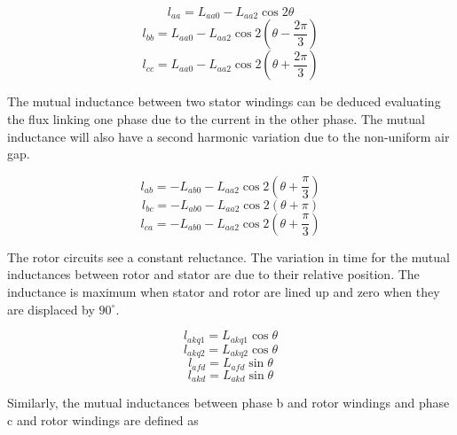 \begin{equation} \label{eq:SelfInductanceA}
	l_{aa} = L_{aa0} - L_{aa2} \cos 2 \theta
\end{equation}
\begin{equation} \label{eq:SelfInductanceB}
	l_{bb} = L_{aa0} - L_{aa2} \cos 2 (\theta - \frac{2 \pi}{3})
\end{equation}
\begin{equation} \label{eq:SelfInductanceC}
	l_{cc} = L_{aa0} - L_{aa2} \cos 2 (\theta + \frac{2 \pi}{3})
\end{equation}

The mutual inductance between two stator windings can be deduced evaluating the flux linking one phase due to the current in the other phase. The mutual inductance will also have a second harmonic variation due to the non-uniform air gap.

\begin{equation} \label{eq:MutualInductanceAB}
	l_{ab} = -L_{ab0} - L_{aa2} \cos 2(\theta + \frac{\pi}{3})
\end{equation}
\begin{equation} \label{eq:MutualInductanceBC}
	l_{bc} = -L_{ab0} - L_{aa2} \cos 2(\theta + \pi)
\end{equation}
\begin{equation} \label{eq:MutualInductanceCA}
	l_{ca} = - L_{ab0} - L_{aa2} \cos 2(\theta + \frac{\pi}{3})
\end{equation}

The rotor circuits see a constant reluctance. The variation in time for the mutual inductances between rotor and stator are due to their relative position. The inductance is maximum when stator and rotor are lined up and zero when they are displaced by $90^{\circ}$.

\begin{equation}
	l_{akq1} = L_{akq1} \cos \theta
\end{equation}
\begin{equation}
	l_{akq2} = L_{akq2} \cos \theta
\end{equation}
\begin{equation}
	l_{afd} = L_{afd} \sin \theta
\end{equation}
\begin{equation}
	l_{akd} = L_{akd} \sin \theta
\end{equation}

Similarly, the mutual inductances between phase b and rotor windings and phase c and rotor windings are defined as

